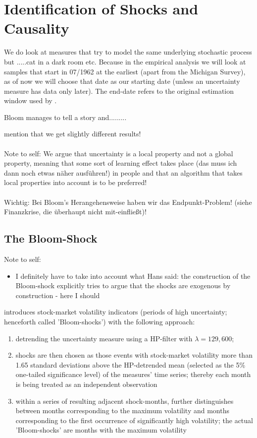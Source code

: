 \documentclass[a4paper,11pt,listof=nochaptergap,oneside,pointednumbers,bibtotoc,bigheadings,liststotoc]{scrbook}
\theoremstyle{mysatz}
\theoremstyle{mydefinition}
\theoremstyle{mybemerkung}
\begin{document}
\section{Identification of Shocks and Causality}
We do look at measures that try to model the same underlying stochastic process but .....cat in a dark room etc.
Because in the empirical analysis we will look at samples that start in 07/1962 at the earliest (apart from the Michigan Survey), as of now we will choose that date as our starting date (unless an uncertainty measure has data only later). The end-date refers to the original estimation window used by \citet{bloom:09}.


Bloom manages to tell a story and.........

mention that we get slightly different results!
\\
\\Note to self: We argue that uncertainty is a local property and not a global property, meaning that some sort of learning effect takes place (das muss ich dann noch etwas näher ausführen!) in people and that an algorithm that takes local properties
into account is to be preferred!
\\
\\
Wichtig: Bei Bloom's Herangehensweise haben wir das Endpunkt-Problem! (siehe Finanzkrise, die überhaupt nicht mit-einfließt)!


\subsection{The Bloom-Shock}
\label{sec:bloom_shock}
\begingroup
    \fontsize{8pt}{12pt}\selectfont
    Note to self:
\begin{itemize}
	\item I definitely have to take into account what Hans said: the construction of the Bloom-shock explicitly tries to argue that the shocks are exogenous by construction - here I should 
\end{itemize}
\endgroup


\citet{bloom:09} introduces stock-market volatility indicators (periods of high uncertainty; henceforth called 'Bloom-shocks') with the following approach:
\begin{enumerate}[i]
	\item detrending the uncertainty measure using a HP-filter with $\lambda = 129,600$; 
	\item shocks are then chosen as those events with stock-market volatility more than 1.65 standard deviations above the HP-detrended mean (selected as the 5\% one-tailed significance level) of the measures' time series; thereby each month is being treated as an independent observation
	\item within a series of resulting adjacent shock-months, \citet{bloom:09} further distinguishes between months corresponding to the maximum volatility and months corresponding to the first occurrence of significantly high volatility; the actual 'Bloom-shocks' are months with the maximum volatility
\end{enumerate}
\end{document}
